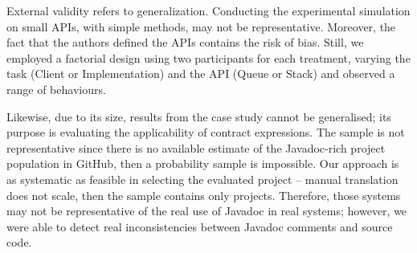 External validity refers to generalization. 
Conducting the experimental simulation on small APIs, with simple methods, may not be representative. Moreover, the fact that the authors defined the APIs contains the risk of bias. Still, we employed a factorial design using two participants for each treatment, varying the task (Client or Implementation) and the API (Queue or Stack) and observed a range of behaviours. 

Likewise, due to its size, results from the case study cannot be generalised; its purpose is evaluating the applicability of contract expressions.
The sample is not representative since there is no available estimate of the Javadoc-rich project
population in GitHub, then a probability sample is impossible. 
Our approach is as systematic as feasible in selecting the evaluated project -- manual translation
does not scale, then the sample contains only \totalSystems{} projects.
Therefore, those systems may not be representative of the real use of Javadoc in real systems; however, we were able to detect real inconsistencies between Javadoc comments and source code.



